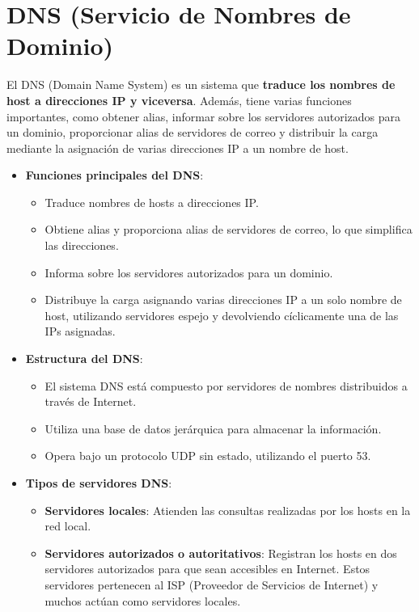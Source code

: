 \documentclass{article}
\begin{document}
\section{DNS (Servicio de Nombres de Dominio)}

El DNS (Domain Name System) es un sistema que \textbf{traduce los nombres de host a direcciones IP y viceversa}. Además, tiene varias funciones importantes, como obtener alias, informar sobre los servidores autorizados para un dominio, proporcionar alias de servidores de correo y distribuir la carga mediante la asignación de varias direcciones IP a un nombre de host.

\begin{itemize}
    \item \textbf{Funciones principales del DNS}:
    \begin{itemize}
        \item Traduce nombres de hosts a direcciones IP.
        \item Obtiene alias y proporciona alias de servidores de correo, lo que simplifica las direcciones.
        \item Informa sobre los servidores autorizados para un dominio.
        \item Distribuye la carga asignando varias direcciones IP a un solo nombre de host, utilizando servidores espejo y devolviendo cíclicamente una de las IPs asignadas.
    \end{itemize}
    \item \textbf{Estructura del DNS}:
    \begin{itemize}
        \item El sistema DNS está compuesto por servidores de nombres distribuidos a través de Internet.
        \item Utiliza una base de datos jerárquica para almacenar la información.
        \item Opera bajo un protocolo UDP sin estado, utilizando el puerto 53.
    \end{itemize}
    \item \textbf{Tipos de servidores DNS}:
    \begin{itemize}
        \item \textbf{Servidores locales}: Atienden las consultas realizadas por los hosts en la red local.
        \item \textbf{Servidores autorizados o autoritativos}: Registran los hosts en dos servidores autorizados para que sean accesibles en Internet. Estos servidores pertenecen al ISP (Proveedor de Servicios de Internet) y muchos actúan como servidores locales.

\end{itemize}
\end{itemize}
\end{document}
